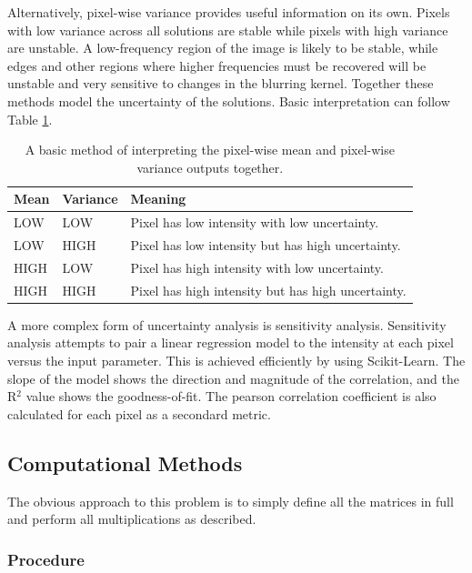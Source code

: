 \documentclass[letterpaper, 11pt, titlepage, twocolumn]{article}
\begin{document}
Alternatively, pixel-wise variance provides useful information on its own. Pixels with low variance across all solutions are stable while pixels with high variance are unstable. A low-frequency region of the image is likely to be stable, while edges and other regions where higher frequencies must be recovered will be unstable and very sensitive to changes in the blurring kernel. Together these methods model the uncertainty of the solutions. Basic interpretation can follow Table \ref{table:meanvar}.

\begin{table}
  \centering
  \begin{tabular}{|l|l|l|}
    \hline
    Mean & Variance & Meaning\\
    \hline\hline
    LOW & LOW & Pixel has low intensity with low uncertainty.\\\hline
    LOW & HIGH & Pixel has low intensity but has high uncertainty. \\\hline
    HIGH & LOW & Pixel has high intensity with low uncertainty. \\\hline
    HIGH & HIGH & Pixel has high intensity but has high uncertainty.\\\hline
  \end{tabular}
  \caption{A basic method of interpreting the pixel-wise mean and pixel-wise variance outputs together.}
  \label{table:meanvar}
\end{table}

A more complex form of uncertainty analysis is sensitivity analysis. Sensitivity analysis attempts to pair a linear regression model to the intensity at each pixel versus the input parameter. This is achieved efficiently by using Scikit-Learn. The slope of the model shows the direction and magnitude of the correlation, and the R$^2$ value shows the goodness-of-fit. The pearson correlation coefficient is also calculated for each pixel as a secondard metric.

\subsection{Computational Methods}
The obvious approach to this problem is to simply define all the matrices in full and perform all multiplications as described.


\subsubsection{Procedure}
\end{document}
